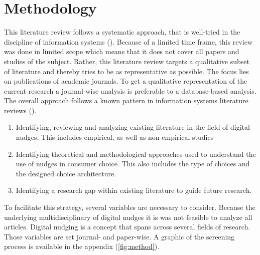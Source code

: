 \section{Methodology}

This literature review follows a systematic approach, that is well-tried in the discipline of information systems (\cite{webster_analyzing_2002}). Because of a limited time frame, this review was done in limited scope which means that it does not cover all papers and studies of the subject. Rather, this literature review targets a qualitative subset of literature and thereby tries to be as representative as possible. The focus lies on publications of academic journals. To get a qualitative representation of the current research a journal-wise analysis is preferable to a database-based analysis. The overall approach follows a known pattern in information systems literature reviews (\cite{alavi_review_1992}).
\begin{enumerate}
\item Identifying, reviewing and analyzing existing literature in the field of digital nudges. This includes empirical, as well as non-empirical studies
\item Identifying theoretical and methodological approaches used to understand the use of nudges in consumer choice. This also includes the type of choices and the designed choice architecture.
\item Identifying a research gap within existing literature to guide future research.
\end{enumerate}

To facilitate this strategy, several variables are necessary to consider. Because the underlying multidisciplinary of digital nudges it is was not feasible to analyze all articles. Digital nudging is a concept that spans across several fields of research. Those variables are set journal- and paper-wise. A graphic of the screening process is available in the appendix (\ref{fig:method}).

